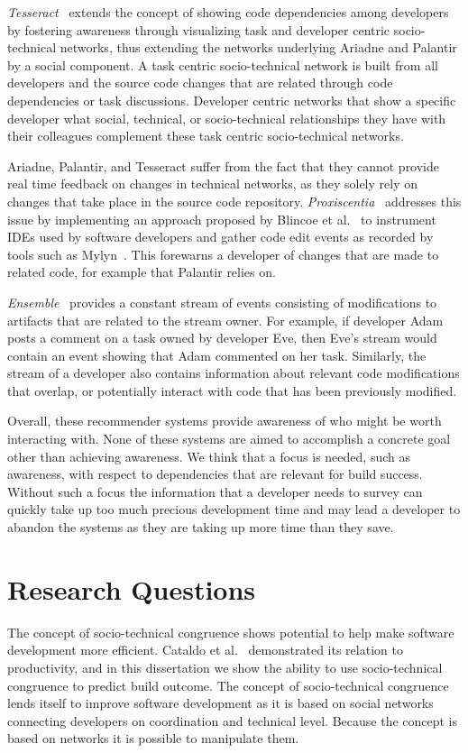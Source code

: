 \emph{Tesseract}~\cite{sarma:icse:2009} extends the concept of showing code dependencies among developers by fostering awareness through visualizing task and developer centric socio-technical networks, thus extending the networks underlying Ariadne and Palantir by a social component.
A task centric socio-technical network is built from all developers and the source code changes that are related through code dependencies or task discussions.
Developer centric networks that show a specific developer what social, technical, or socio-technical relationships they have with their colleagues complement these task centric socio-technical networks.

Ariadne, Palantir, and Tesseract suffer from the fact that they cannot provide real time feedback on changes in  technical networks, as they solely rely on changes that take place in the source code repository. 
\emph{Proxiscentia}~\cite{borici:chase:2012} addresses this issue by implementing an approach proposed by Blincoe et al.~\cite{blincoe:cscw:2012} to instrument IDEs used by software developers and gather code edit events as recorded by tools such as Mylyn~\cite{kersten:aosd:2005}.
This forewarns a developer of changes that are made to related code, for example that Palantir relies on.

\emph{Ensemble}~\cite{xiang:rsse:2008} provides a constant stream of events consisting of modifications to artifacts that are related to the stream owner.
For example, if developer Adam posts a comment on a task owned by developer Eve, then Eve's stream would contain an event showing that Adam commented on her task.
Similarly, the stream of a developer also contains information about relevant code modifications that overlap, or potentially interact with code that has been previously modified.

Overall, these recommender systems provide awareness of who might be worth interacting with.
None of these systems are aimed to accomplish a concrete goal other than achieving awareness.
We think that a focus is needed, such as awareness, with respect to dependencies that are relevant for build success.
Without such a focus the information that a developer needs to survey can quickly take up too much precious development time and may lead a developer to abandon the systems as they are taking up more time than they save.


\section{Research Questions}
The concept of socio-technical congruence shows potential to help make software development more efficient.
Cataldo et al.~\cite{cataldo:cscw:2006} demonstrated its relation to productivity, and in this dissertation we show the ability to use socio-technical congruence to predict build outcome.
The concept of socio-technical congruence lends itself to improve software development as it is based on social networks connecting developers on coordination and technical level.
Because the concept is based on networks it is possible to manipulate them.

